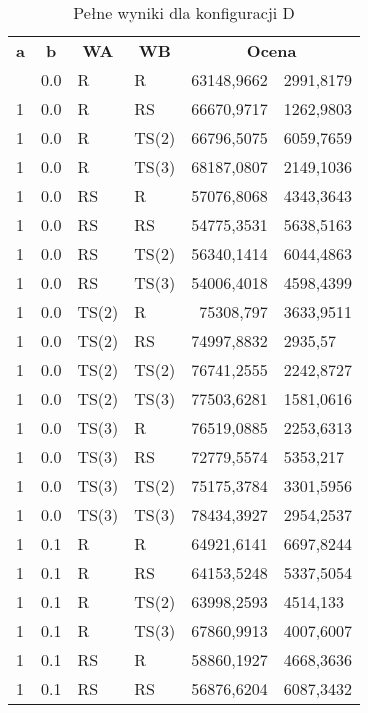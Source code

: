 \documentclass[twoside]{iisthesis}
\begin{document}
\begin{center}
	\begin{longtable}{|l|l|l|l|r@{$\pm$}l|}
		\caption{Pełne wyniki dla konfiguracji D}
		\label{table:tsp_results_compare_d_full}\\
		\hline
		\multicolumn{1}{|c|}{{\bf a}} & \multicolumn{1}{c|}{{\bf b}} & \multicolumn{1}{c|}{{\bf WA}} & \multicolumn{1}{c|}{{\bf WB}} & \multicolumn{2}{c|}{{\bf Ocena}} \\ \hhline{======}
		\endhead
		1 & 0.0 & R & R & 63148,9662 & 2991,8179\\ \hline
		1 & 0.0 & R & RS & 66670,9717 & 1262,9803\\ \hline
		1 & 0.0 & R & TS(2) & 66796,5075 & 6059,7659\\ \hline
		1 & 0.0 & R & TS(3) & 68187,0807 & 2149,1036\\ \hline
		1 & 0.0 & RS & R & 57076,8068 & 4343,3643\\ \hline
		1 & 0.0 & RS & RS & 54775,3531 & 5638,5163\\ \hline
		1 & 0.0 & RS & TS(2) & 56340,1414 & 6044,4863\\ \hline
		1 & 0.0 & RS & TS(3) & 54006,4018 & 4598,4399\\ \hline
		1 & 0.0 & TS(2) & R & 75308,797 & 3633,9511\\ \hline
		1 & 0.0 & TS(2) & RS & 74997,8832 & 2935,57\\ \hline
		1 & 0.0 & TS(2) & TS(2) & 76741,2555 & 2242,8727\\ \hline
		1 & 0.0 & TS(2) & TS(3) & 77503,6281 & 1581,0616\\ \hline
		1 & 0.0 & TS(3) & R & 76519,0885 & 2253,6313\\ \hline
		1 & 0.0 & TS(3) & RS & 72779,5574 & 5353,217\\ \hline
		1 & 0.0 & TS(3) & TS(2) & 75175,3784 & 3301,5956\\ \hline
		1 & 0.0 & TS(3) & TS(3) & 78434,3927 & 2954,2537\\ \hline
		1 & 0.1 & R & R & 64921,6141 & 6697,8244\\ \hline
		1 & 0.1 & R & RS & 64153,5248 & 5337,5054\\ \hline
		1 & 0.1 & R & TS(2) & 63998,2593 & 4514,133\\ \hline
		1 & 0.1 & R & TS(3) & 67860,9913 & 4007,6007\\ \hline
		1 & 0.1 & RS & R & 58860,1927 & 4668,3636\\ \hline
		1 & 0.1 & RS & RS & 56876,6204 & 6087,3432\\ \hline

\end{longtable}
\end{center}
\end{document}
